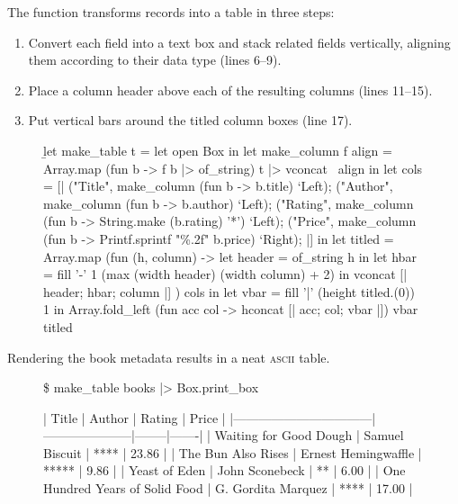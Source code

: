 \documentclass{article}
\begin{document}
The \href{#ref-make-table}{} function transforms records into a table in three steps:
\begin{enumerate}
\item Convert each field into a text box and stack related fields vertically, aligning them according to their data type (lines 6--9).
\item Place a column header above each of the resulting columns (lines 11--15).
\item Put vertical bars around the titled column boxes (line 17).
\end{enumerate}

\begin{figure}
\begin{code}
\b{let} make_table t =\label{ref-make-table}
    let open Box in
    let make_column f align =
        Array.map (fun b -> f b |> of_string) t |> vconcat ~align in
    let cols = [|
        ("Title",  make_column (fun b -> b.title) `Left);
        ("Author", make_column (fun b -> b.author) `Left);
        ("Rating", make_column (fun b -> String.make (b.rating) '*') `Left);
        ("Price",  make_column (fun b -> Printf.sprintf "\%.2f" b.price) `Right);
    |] in
    let titled = Array.map (fun (h, column) ->
        let header = of_string h in
        let hbar = fill '-' 1 (max (width header) (width column) + 2)
        in vconcat [| header; hbar; column |]
    ) cols in
    let vbar = fill '|' (height titled.(0)) 1 in
    Array.fold_left (fun acc col -> hconcat [| acc; col; vbar |]) vbar titled
\end{code}
\end{figure}

Rendering the book metadata results in a neat \textsc{ascii} table.

\begin{figure}
\begin{code}[text]
\$ make_table books |> Box.print_box

|              Title              |       Author        | Rating | Price |
|---------------------------------|---------------------|--------|-------|
| Waiting for Good Dough          | Samuel Biscuit      | ****   | 23.86 |
| The Bun Also Rises              | Ernest Hemingwaffle | *****  |  9.86 |
| Yeast of Eden                   | John Sconebeck      | **     |  6.00 |
| One Hundred Years of Solid Food | G. Gordita Marquez  | ****   | 17.00 |
\end{code}
\end{figure}
\end{document}
